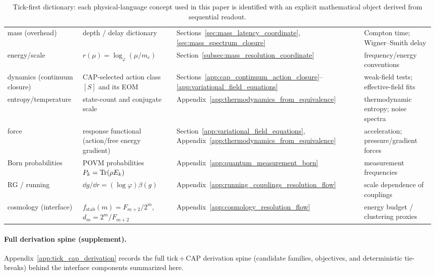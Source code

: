 \begin{table}[t]
\begin{tabular}{p{} p{} p{} p{}}
mass (overhead) & depth / delay dictionary & Sections~\ref{sec:mass_latency_coordinate}, \ref{sec:mass_spectrum_closure} & Compton time; Wigner--Smith delay \\
energy/scale & $r(\mu)=\log_\varphi(\mu/m_e)$ & Section~\ref{subsec:mass_resolution_coordinate} & frequency/energy conventions \\
dynamics (continuum closure) & CAP-selected action class $[S]$ and its EOM & Sections~\ref{app:cap_continuum_action_closure}--\ref{app:variational_field_equations} & weak-field tests; effective-field fits \\
entropy/temperature & state-count and conjugate scale & Appendix~\ref{app:thermodynamics_from_equivalence} & thermodynamic entropy; noise spectra \\
force & response functional (action/free energy gradient) & Section~\ref{app:variational_field_equations}, Appendix~\ref{app:thermodynamics_from_equivalence} & acceleration; pressure/gradient forces \\
Born probabilities & POVM probabilities $P_k=\mathrm{Tr}(\rho E_k)$ & Appendix~\ref{app:quantum_measurement_born} & measurement frequencies \\
RG / running & $\dd g/\dd r=(\log\varphi)\beta(g)$ & Appendix~\ref{app:running_couplings_resolution_flow} & scale dependence of couplings \\
cosmology (interface) & $f_{\mathrm{stab}}(m)=F_{m+2}/2^m$, $d_m=2^m/F_{m+2}$ & Appendix~\ref{app:cosmology_resolution_flow} & energy budget / clustering proxies \\
\bottomrule
\end{tabular}
\caption{Tick-first dictionary: each physical-language concept used in this paper is identified with an explicit mathematical object derived from sequential readout.}
\label{tab:tick_dictionary}
\end{table}

\paragraph{Full derivation spine (supplement).}
\AuditTag Appendix~\ref{app:tick_cap_derivation} records the full tick\,+\,CAP derivation spine (candidate families, objectives, and deterministic tie-breaks) behind the interface components summarized here.



